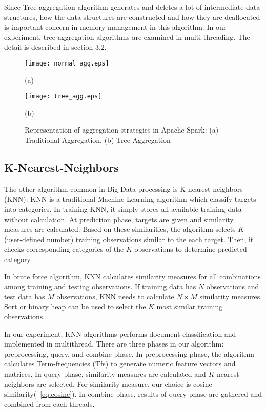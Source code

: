 Since Tree-aggregation algorithm generates and deletes a lot of intermediate data structures, 
how the data structures are constructed and how they are deallocated is important concern in memory management in this algorithm.
In our experiment, tree-aggregation algorithms are examined in multi-threading. The detail is described in section 3.2.

\begin{figure}[htb]
    \begin{minipage}[t]{0.5\linewidth}\centering
        \texttt{[image: normal\_agg.eps]}
        \medskip
        \centerline{(a)}
        \end{minipage}\hfill
        \begin{minipage}[t]{0.5\linewidth}\centering
        \texttt{[image: tree\_agg.eps]} 
        \medskip
        \centerline{(b)}
    \end{minipage}\hfill
    \caption{Representation of aggregation strategies in Apache Spark: (a) Traditional Aggregation, (b) Tree Aggregation}
    \label{fig:aggregationk_patttern}
\end{figure}

\subsection{K-Nearest-Neighbors}
\label{sec:concept_history}
The other algorithm common in Big Data processing is K-nearest-neighbors (KNN). KNN is a traditional Machine Learning algorithm which classify targets into categories. 
In training KNN, it simply stores all available training data without calculation. At prediction phase, targets are given and similarity measures are calculated. 
Based on these similarities, the algorithm selects \(K\) (user-defined number) training observations similar to the each target. 
Then, it checks corresponding categories of the \(K\) observations to determine predicted category. 

In brute force algorithm, KNN calculates similarity measures for all combinations among training and testing observations. 
If training data has \(N\) observations and test data has \(M\) observations, KNN needs to calculate \(N \times M\) similarity measures. 
Sort or binary heap can be used to select the \(K\) most similar training observations.

In our experiment, KNN algorithms performs document classification and implemented in multithread. 
There are three phases in our algorithm: preprocessing, query, and combine phase. 
In preprocessing phase, the algorithm calculates Term-frequencies (Tfs) to generate numeric feature vectors and matrices. 
In query phase, similarity measures are calculated and \(K\) nearest neighbors are selected. 
For similarity measure, our choice is cosine similarity(~\ref{eq:cosine}). 
In combine phase, results of query phase are gathered and combined from each threads.

